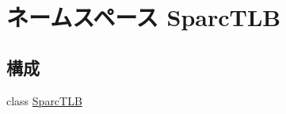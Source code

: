 \hypertarget{namespaceSparcTLB}{
\section{ネームスペース SparcTLB}
\label{namespaceSparcTLB}
}
\subsection*{構成}
\begin{DoxyCompactItemize}
\item 
class \hyperlink{classSparcTLB_1_1SparcTLB}{SparcTLB}
\end{DoxyCompactItemize}
